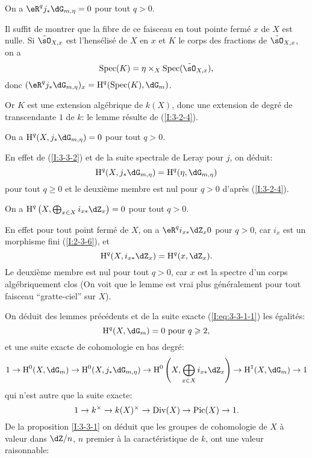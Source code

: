 \begin{lemma}\label{I:3-3-2}
On a $\eR^q j_* \dG_{m,\eta} = 0$ pour tout $q>0$.
\end{lemma}

Il suffit de montrer que la fibre de ce faisceau en tout pointe fermé $x$ 
de $X$ est nulle. Si $\tilde\sO_{X,x}$ est l'hensélisé de $X$ en $x$ et $K$ 
le corps des fractions de $\tilde\sO_{X,x}$, on a 
\[
  \spec(K) = \eta\times_X \spec(\tilde\sO_{X,x})\text{,}
\]
donc $(\eR^qj_*\dG_{m,\eta})_x = \h^q(\spec(K),\dG_m)$. 

Or $K$ est une extension algébrique de $k(X)$, donc une extension de degré 
de transcendante $1$ de $k$: le lemme résulte de (\ref{I:3-2-4}). 





\begin{lemma}\label{I:3-3-3}
On a $\h^q(X, j_*\dG_{m,\eta}) = 0$ pour tout $q>0$.
\end{lemma}

En effet de (\ref{I:3-3-2}) et de la suite spectrale de Leray pour $j$, on 
déduit:
\[
  \h^q(X, j_* \dG_{m,\eta}) = \h^q(\eta,\dG_{m,\eta})
\]
pour tout $q\geqslant 0$ et le deuxième membre est nul pour $q>0$ d'après 
(\ref{I:3-2-4}). 





\begin{lemma}\label{I:3-3-4}
On a $\h^q\left(X,\bigoplus_{x\in X} i_{x*} \dZ_x\right) = 0$ pour tout $q>0$. 
\end{lemma}

En effet pour tout point fermé de $X$, on a $\eR^q i_{x*}\dZ_x 0$ pour $q>0$, 
car $i_x$ est un morphisme fini (\ref{I:2-3-6}), et 
\[
  \h^q(X,i_{x*}\dZ_x) = \h^q(x,\dZ_x)\text{.}
\]
Le deuxième membre est nul pour tout $q>0$, car $x$ est la spectre d'un 
corps algébriquement clos (On voit que le lemme est vrai plus 
généralement pour tout faisceau ``gratte-ciel'' sur $X$). 

On déduit des lemmes précédents et de la suite exacte (\ref{I:eq:3-3-1-1}) 
les égalités:
\[
  \h^q(X,\dG_m) = 0 \text{ pour $q\geqslant 2$,}
\]
et une suite exacte de cohomologie en bas degré:
\[
  1 \to \h^0(X,\dG_m) \to \h^0(X, j_*\dG_{m,\eta}) \to \h^0\left(X,\bigoplus_{x\in X} i_{x*}\dZ_x\right) \to \h^1(X,\dG_m) \to 1
\]
qui n'est autre que la suite exacte:
\[
  1 \to k^\times \to k(X)^\times\to \operatorname{Div}(X) \to \operatorname{Pic}(X) \to 1\text{.}
\]
De la proposition \ref{I:3-3-1} on déduit que les groupes de cohomologie de 
$X$ à valeur dans $\dZ/n$, $n$ premier à la caractéristique de $k$, ont 
une valeur raisonnable:





